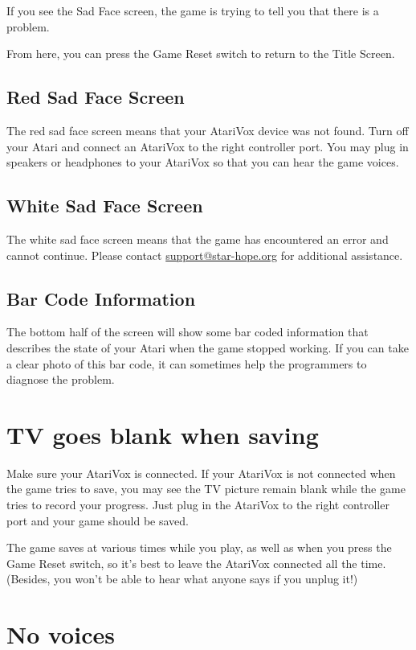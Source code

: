 \documentclass[10pt,twoside,openright]{memoir}
\begin{document}
If you see the Sad Face screen, the game is trying to tell you that
there is a problem.

From here, you can press the Game Reset switch to return to the Title
Screen. 

\subsection{Red Sad Face Screen}

The red sad  face screen means that your AtariVox  device was not found. 
Turn off your Atari and connect an AtariVox to the right controller port. 
You may plug in speakers or headphones to your AtariVox so that you can hear
the game voices.

\subsection{White Sad Face Screen}

The white sad  face screen means that the game  has encountered an error and
cannot continue.  Please contact
\href{mailto:support@star-hope.org}{support@star-hope.org} for additional
assistance.

\subsection{Bar Code Information}

The bottom half of the screen will show some bar coded information
that describes the state of your Atari when the game stopped
working. If you can take a clear photo of this bar code, it can
sometimes help the programmers to diagnose the problem.

\section{TV goes blank when saving}

Make sure your AtariVox is connected. If your AtariVox is not
connected when the game tries to save, you may see the TV picture
remain blank while the game tries to record your progress. Just plug
in the AtariVox to the right controller port and your game should be
saved.

The game saves at various times while you play, as well as when you
press the Game Reset switch, so it's best to leave the AtariVox
connected all the time. (Besides, you won't be able to hear what
anyone says if you unplug it!)

\section{No voices}
\end{document}
